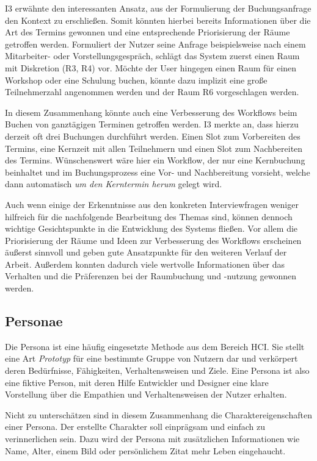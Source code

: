 I3 erwähnte den interessanten Ansatz, aus der Formulierung der Buchungsanfrage den Kontext zu erschließen. Somit könnten hierbei bereits Informationen über die Art des Termins gewonnen und eine entsprechende Priorisierung der Räume getroffen werden. Formuliert der Nutzer seine Anfrage beispielsweise nach einem Mitarbeiter- oder Vorstellungsgespräch, schlägt das System zuerst einen Raum mit Diskretion (R3, R4) vor. Möchte der User hingegen einen Raum für einen Workshop oder eine Schulung buchen, könnte dazu implizit eine große Teilnehmerzahl angenommen werden und der Raum R6 vorgeschlagen werden. 

In diesem Zusammenhang könnte auch eine Verbesserung des Workflows beim Buchen von ganztägigen Terminen getroffen werden. I3 merkte an, dass hierzu derzeit oft drei Buchungen durchführt werden. Einen Slot zum Vorbereiten des Termins, eine Kernzeit mit allen Teilnehmern und einen Slot zum Nachbereiten des Termins. Wünschenswert wäre hier ein Workflow, der nur eine Kernbuchung beinhaltet und im Buchungsprozess eine Vor- und Nachbereitung vorsieht, welche dann automatisch \textit{um den Kerntermin herum} gelegt wird. 

Auch wenn einige der Erkenntnisse aus den konkreten Interviewfragen weniger hilfreich für die nachfolgende Bearbeitung des Themas sind, können dennoch wichtige Gesichtspunkte in die Entwicklung des Systems fließen. Vor allem die Priorisierung der Räume und Ideen zur Verbesserung des Workflows erscheinen äußerst sinnvoll und geben gute Ansatzpunkte für den weiteren Verlauf der Arbeit. Außerdem konnten dadurch viele wertvolle Informationen über das Verhalten und die Präferenzen bei der Raumbuchung und -nutzung gewonnen werden.

\subsection{Personae}
\label{subsec:personae}

Die Persona ist eine häufig eingesetzte Methode aus dem Bereich \acl{HCI}. Sie stellt eine Art \textit{Prototyp} für eine bestimmte Gruppe von Nutzern dar und verkörpert deren Bedürfnisse, Fähigkeiten, Verhaltensweisen und Ziele. Eine Persona ist also eine fiktive Person, mit deren Hilfe Entwickler und Designer eine klare Vorstellung über die Empathien und Verhaltensweisen der Nutzer erhalten.

Nicht zu unterschätzen sind in diesem Zusammenhang die Charaktereigenschaften einer Persona. Der erstellte Charakter soll einprägsam und einfach zu verinnerlichen sein. Dazu wird der Persona mit zusätzlichen Informationen wie Name, Alter, einem Bild oder persönlichem Zitat mehr Leben eingehaucht. \cite[S. 57-58]{richter_usability_2016} 

